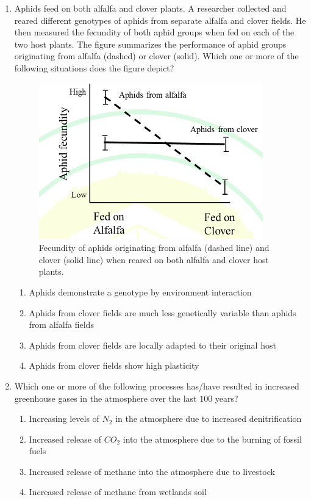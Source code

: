 \documentclass[journal]{IEEEtran}
\begin{document}
\begin{enumerate}
    \item Aphids feed on both alfalfa and clover plants.
A researcher collected and reared different genotypes of aphids from separate alfalfa and clover fields.
He then measured the fecundity of both aphid groups when fed on each of the two host plants.
The figure summarizes the performance of aphid groups originating from alfalfa (dashed) or clover (solid).
Which one or more of the following situations does the figure depict?
\begin{figure}[!h]
        \centering
        \includegraphics[width=0.4\columnwidth]{figs/Q.56.png}
        \caption{Fecundity of aphids originating from alfalfa (dashed line) and clover (solid line) when reared on both alfalfa and clover host plants.}
        \label{fig:Q.56}
    \end{figure}
    \begin{enumerate}
        \item Aphids demonstrate a genotype by environment interaction
        \item Aphids from clover fields are much less genetically variable than aphids from alfalfa fields
        \item Aphids from clover fields are locally adapted to their original host
        \item Aphids from clover fields show high plasticity
    \end{enumerate}
 
   
    \item Which one or more of the following processes has/have resulted in increased greenhouse gases in the atmosphere over the last $100$ years?
\begin{enumerate}
        \item Increasing levels of $N_2$ in the atmosphere due to increased denitrification
        \item Increased release of $CO_2$ into the atmosphere due to the burning of fossil fuels
        \item Increased release of methane into the atmosphere due to livestock
        \item Increased release of methane from wetlands soil
    \end{enumerate}
    

\end{enumerate}
\end{document}
